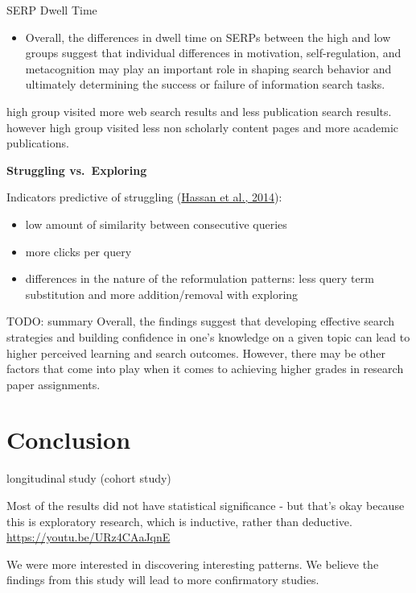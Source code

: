 \documentclass[letterpaper, nobind]{templates/ociamthesis}
\providecommand{\tightlist}{%
  \setlength{\itemsep}{0pt}\setlength{\parskip}{0pt}}
\begin{document}
SERP Dwell Time

\begin{itemize}
\tightlist
\item
  Overall, the differences in dwell time on SERPs between the high and low groups suggest that individual differences in motivation, self-regulation, and metacognition may play an important role in shaping search behavior and ultimately determining the success or failure of information search tasks.
\end{itemize}

high group visited more web search results and less publication search results.
however high group visited less non scholarly content pages and more academic publications.

\textbf{Struggling vs.~Exploring}

Indicators predictive of struggling (\protect\hyperlink{ref-hassan2014struggling}{Hassan et al., 2014}):

\begin{itemize}
\tightlist
\item
  low amount of similarity between consecutive queries
\item
  more clicks per query
\item
  differences in the nature of the reformulation patterns: less query term substitution and more addition/removal with exploring
\end{itemize}

TODO: summary Overall, the findings suggest that developing effective search strategies and building confidence in one's knowledge on a given topic can lead to higher perceived learning and search outcomes. However, there may be other factors that come into play when it comes to achieving higher grades in research paper assignments.

\hypertarget{conclusion}{%
\chapter{Conclusion}\label{conclusion}}

longitudinal study (cohort study)

Most of the results did not have statistical significance - but that's okay because this is exploratory research, which is inductive, rather than deductive.\\
\url{https://youtu.be/URz4CAaJqnE}

We were more interested in discovering interesting patterns.
We believe the findings from this study will lead to more confirmatory studies.
\end{document}
